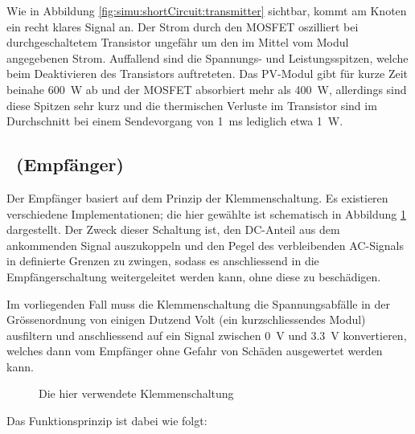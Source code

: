 Wie  in Abbildung  \ref{fig:simu:shortCircuit:transmitter} sichtbar,  kommt am
Knoten  ein  recht klares Signal an. Der Strom  durch den MOSFET
oszilliert bei  durchgeschaltetem Transistor ungef\"ahr  um den im  Mittel vom
Modul angegebenen Strom. Auffallend sind  die Spannungs- und Leistungsspitzen,
welche beim Deaktivieren des  Transistors auftreteten. Das PV-Modul gibt f\"ur
kurze  Zeit beinahe  \SI{600}{\watt} ab  und  der MOSFET  absorbiert mehr  als
\SI{400}{\watt}, allerdings sind  diese Spitzen sehr kurz  und die thermischen
Verluste  im  Transistor  sind  im Durchschnitt  bei  einem  Sendevorgang  von
\SI{1}{\milli\second} lediglich etwa \SI{1}{\watt}.


\clearpage
\subsection{\Master~(Empf\"anger)}
\label{subsec:simu:ask:recv}

Der Empf\"anger  basiert auf  dem Prinzip der  Klemmenschaltung. Es existieren
verschiedene  Implementationen;   die  hier  gew\"ahlte  ist   schematisch  in
Abbildung  \ref{fig:circuit:clamper} dargestellt. Der  Zweck dieser  Schaltung
ist,  den DC-Anteil  aus dem  ankommenden  Signal auszukoppeln  und den  Pegel
des  verbleibenden AC-Signals  in  definierte Grenzen  zu  zwingen, sodass  es
anschliessend  in die  Empf\"angerschaltung weitergeleitet  werden kann,  ohne
diese zu besch\"adigen.

Im vorliegenden Fall  muss die Klemmenschaltung die  Spannungsabf\"alle in der
Gr\"ossenordnung  von  einigen  Dutzend  Volt  (ein  kurzschliessendes  Modul)
ausfiltern  und  anschliessend  auf  ein  Signal  zwischen  \SI{0}{\volt}  und
\SI{3.3}{\volt}  konvertieren, welches  dann vom  Empf\"anger ohne  Gefahr von
Sch\"aden ausgewertet werden kann.

\begin{figure}[h!tb]
    \centering
    
    \caption[Klemmenschaltung]{Die hier verwendete Klemmenschaltung}
    \label{fig:circuit:clamper}
\end{figure}

Das Funktionsprinzip ist dabei wie folgt:

